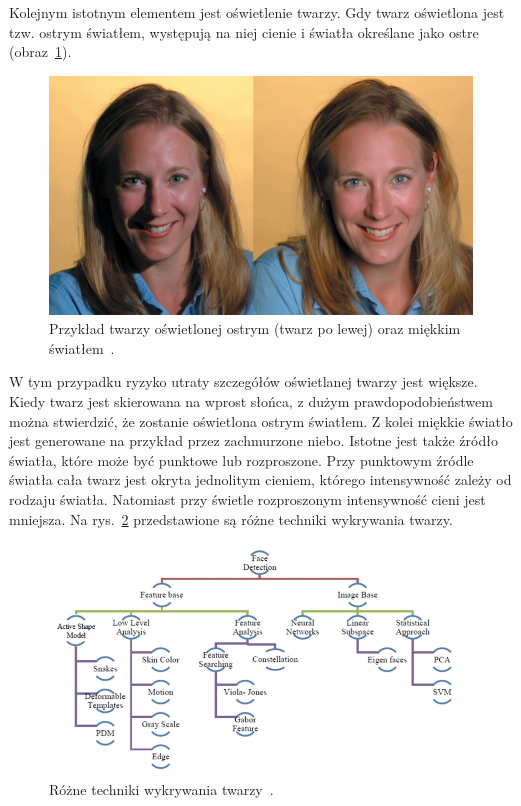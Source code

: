 \documentclass[a4paper,twoside,12pt]{book}
\begin{document}
    Kolejnym istotnym elementem jest oświetlenie twarzy.
    Gdy twarz oświetlona jest tzw. ostrym światłem, występują na
    niej cienie i światła określane jako ostre (obraz~\ref{fig.oswietlenieTwarzy}).
%
%
    \begin{figure}[h!]
        \centering
        \includegraphics[width=12cm]{Obrazy/oswietlenieTwarzy.jpg}
        \caption{Przykład twarzy oświetlonej ostrym (twarz po lewej) oraz miękkim światłem~\cite{oswietlenieTwarzy}.}
        \label{fig.oswietlenieTwarzy}
    \end{figure}
    W tym przypadku ryzyko utraty szczegółów oświetlanej twarzy jest większe.
    Kiedy twarz jest skierowana na wprost słońca, z dużym
    prawdopodobieństwem można stwierdzić, że zostanie oświetlona ostrym światłem.
    Z kolei miękkie światło jest generowane na przykład przez zachmurzone niebo.
    Istotne jest także źródło światła, które
    może być punktowe lub rozproszone.
    Przy punktowym źródle światła cała twarz jest
    okryta jednolitym cieniem, którego intensywność zależy od rodzaju światła.
    Natomiast przy świetle rozproszonym intensywność cieni jest mniejsza.
    Na rys.~\ref{fig.technikiWykrywaniaTwarzy} przedstawione są różne techniki wykrywania twarzy.
    \begin{figure}
        \centering
        \includegraphics[width=15cm]{Obrazy/technikiWykrywaniaTwarzy.jpg}
        \caption{Różne techniki wykrywania twarzy~\cite{faceDetectionTechniques}.}
        \label{fig.technikiWykrywaniaTwarzy}
    \end{figure}
\end{document}
